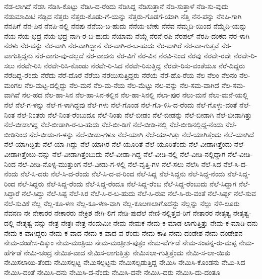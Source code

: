 ನೆಡ-ಲಾಗಿದೆ
ನೆಡಸಿ
ನೆಡಿಸಿ-ಕೊಟ್ಟು
ನೆಡಿಸಿ-ದ-ರೆಂದು
ನೆಡಿಸಿದ್ದ
ನೆಡಿಸುತ್ತಾನೆ
ನೆಡಿ-ಸುತ್ತಾಳೆ
ನೆಡಿ-ಸು-ವುದು
ನೆಡುಮಾಮಿಟಿ
ನೆಡ್ಸಿದ
ನೆತ್ತರು
ನೆತ್ತರು-ಕೊಡು-ಗೆ-ಯನ್ನು
ನೆತ್ತರು-ಗೊಡಗೆ-ಯಾಗಿ
ನೆತ್ತಿ
ನೆನ-ಪನ್ನು
ನೆನಪಿ-ಗಾಗಿ
ನೆನಪಿಗೆ
ನೆನ-ಪಿನ
ನೆನಪಿ-ನಲ್ಲಿ
ನೆನಪು
ನೆನೆಯ-ಬ-ಹುದು
ನೆನೆಯ-ಬೇಕು
ನೆನೆವ
ನೆಮ್ಮದಿ-ಯಿಂದ
ನೆಮ್ಮೆದಿ-ಯನ್ನು
ನೆಯ
ನೆಯ-ಭದ್ರ
ನೆಯ-ಭದ್ರ-ನಾಗಿ-ರ-ಬ-ಹುದು
ನೆಯಾಮ
ನೆಯ್ಗೆ
ನೆರನೆ-ರಪಿ
ನೆರಪಲ್
ನೆರಪಿ-ದಂಕದ
ನೆರ-ಳಾಗಿ
ನೆರಳು
ನೆರ-ವನ್ನು
ನೆರ-ವಾಗಿ
ನೆರ-ವಾಗಿದ್ದಾನೆ
ನೆರ-ವಾಗಿ-ರ-ಬ-ಹುದು
ನೆರ-ವಾಗಿರೆ
ನೆರ-ವಾ-ಗುತ್ತವೆ
ನೆರ-ವಾಗುತ್ತಿದ್ದನು
ನೆರ-ವಾಗು-ವು-ದಲ್ಲದೆ
ನೆರ-ವಾದನು
ನೆರ-ವಿಗೆ
ನೆರ-ವಿನ
ನೆರವಿ-ನಿಂದ
ನೆರವು
ನೆರವೇ-ರದೇ
ನೆರವೇ-ರಿ-ಸಲು
ನೆರವೇ-ರಿಸಿ
ನೆರವೇ-ರಿಸಿ-ಕೊಂಡು
ನೆರವೇ-ರಿ-ಸಿದ
ನೆರವೇ-ರಿಸುತ್ತಿದ್ದ
ನೆರವೇ-ರಿಸು-ವಂತೆಯೂ
ನೆರೆ-ದಿದ್ದರು
ನೆರೆದಿದ್ದ-ರೆಂದು
ನೆರೆದು
ನೆರೆ-ದೊರೆ
ನೆರೆಯ
ನೆರೆಯಿಸುತ್ತಿದ್ದರು
ನೆರೆಯೆ
ನೆರೆ-ಹೊ-ರೆಯ
ನೆಲ
ನೆಲಂ
ನೆಲನಂ
ನೆಲ-ಮಂಗಲ
ನೆಲ-ಮಟ್ಟ-ದಲ್ಲಿದ್ದು
ನೆಲ-ಮನೆ
ನೆಲ-ಮ-ನೆಯ
ನೆಲ-ಮೆಟ್ಟು
ನೆಲ-ವನ್ನು
ನೆಲ-ಸಮ-ವಾಗಿದೆ
ನೆಲ-ಸಮ-ವಾಗಿವೆ
ನೆಲ-ಹದ
ನೆಲ-ಹಾ-ಸಿನ
ನೆಲ-ಹಾ-ಸಿನ-ಕಲ್ಲಿನ
ನೆಲ-ಹಾ-ಸಿನಲ್ಲಿ
ನೆಲಾ-ಪುರ
ನೆಲು-ಮನೆ
ನೆಲು-ಮನೆ-ಯಲ್ಲಿ
ನೆಲೆ
ನೆಲೆ-ಗ-ಳನ್ನು
ನೆಲೆ-ಗ-ಳಾಗಿದ್ದವು
ನೆಲೆ-ಗಳು
ನೆಲೆ-ಗೊಂಡ
ನೆಲೆ-ಗೊ-ಳಿಸಿ-ದ-ರೆಂದು
ನೆಲೆ-ಗೊಳ್ಳು-ವಂತೆ
ನೆಲೆ-ನಿಂತ
ನೆಲೆ-ನಿಂತರು
ನೆಲೆ-ನಿಂತ-ರೆಂಬುದೂ
ನೆಲೆ-ನಿಂತು
ನೆಲೆ-ಬೀಡಂ
ನೆಲೆ-ಬೀಡನ್ನು
ನೆಲೆ-ಬೀಡಾಗಿ
ನೆಲೆ-ಬೀಡಾಗಿತ್ತು
ನೆಲೆ-ಬೀಡಾಗಿದ್ದ
ನೆಲೆ-ಬೀಡಾಗಿ-ರ-ಬ-ಹುದು
ನೆಲೆ-ಬೀ-ಡಿಗೆ
ನೆಲೆ-ಬೀಡಿ-ನಲ್ಲಿ
ನೆಲೆ-ಬೀಡಿನಲ್ಲಿದ್ದ-ನೆಂದು
ನೆಲೆ-ಬೀಡಿನಿಂದ
ನೆಲೆ-ಬೀಡು-ಗ-ಳನ್ನು
ನೆಲೆ-ಬೀಡು-ಗಳೂ
ನೆಲೆ-ಯಾಗಿ
ನೆಲೆ-ಯಾ-ಗಿತ್ತು
ನೆಲೆ-ಯಾಗಿತ್ತೆಂದು
ನೆಲೆ-ಯಾಗಿದೆ
ನೆಲೆ-ಯಾಗಿದ್ದಿತು
ನೆಲೆ-ಯಾ-ಗಿದ್ದು
ನೆಲೆ-ಯಾಗಿರ
ನೆಲೆ-ಯೂರಿತೆ
ನೆಲೆ-ಯೂರಿತೆಂದು
ನೆಲೆ-ವೀಡಾಗಿತ್ತೆಂದು
ನೆಲೆ-ವೀಡಾಗಿತ್ತೆಂಬು-ದನ್ನು
ನೆಲೆ-ವೀಡಾಗಿತ್ತೆಂಬುದು
ನೆಲೆ-ವೀಡಾ-ಗಿದ್ದ
ನೆಲೆ-ವೀಡಿ-ನಲ್ಲಿ
ನೆಲೆ-ವೀಡಿ-ನಲ್ಲಿದ್ದಾಗ
ನೆಲೆ-ವೀಡಿ-ನಿಂದ
ನೆಲೆ-ವೀಡಿ-ನೊಳ್ಸ-ಮುತ್ತುಂಗ
ನೆಲೆ-ವೀಡು-ಗ-ಳಲ್ಲಿ
ನೆಲೆ-ವೃತ್ತಿ-ಗಳ
ನೆಲೆ-ಸಲು
ನೆಲೆಸಿ
ನೆಲೆ-ಸಿದ
ನೆಲೆ-ಸಿ-ದ-ನೆಂದು
ನೆಲೆ-ಸಿ-ದರು
ನೆಲೆ-ಸಿ-ದ-ರೆಂದು
ನೆಲೆ-ಸಿ-ದ-ವ-ರಿಂದ
ನೆಲೆ-ಸಿದ್ದ
ನೆಲೆ-ಸಿದ್ದನು
ನೆಲೆ-ಸಿದ್ದ-ನೆಂದು
ನೆಲೆ-ಸಿದ್ದ-ರಿಂದ
ನೆಲೆ-ಸಿದ್ದರು
ನೆಲೆ-ಸಿದ್ದ-ರೆಂದು
ನೆಲೆ-ಸಿದ್ದ-ರೆಂದೂ
ನೆಲೆ-ಸಿದ್ದ-ರೆಂಬ
ನೆಲೆ-ಸಿದ್ದ-ರೆಂಬುದು
ನೆಲೆ-ಸಿದ್ದಾಗ
ನೆಲೆ-ಸಿದ್ದಾರೆ
ನೆಲೆ-ಸಿದ್ದು
ನೆಲೆ-ಸಿಪ್ಪ
ನೆಲೆ-ಸಿರ
ನೆಲೆ-ಸಿ-ರ-ಬ-ಹುದು
ನೆಲೆ-ಸಿ-ರುವ
ನೆಲೆ-ಸಿ-ರು-ವಂತೆ
ನೆಲೆ-ಸಿರ್ಪ್ಪ
ನೆಲೆ-ಸುವ
ನೆಲೆ-ಸುವಿಕೆ
ನೆಲ್ಲ
ನೆಲ್ಲ-ಕೂ-ಳಣ
ನೆಲ್ಲ-ಕೂ-ಳಣ-ವಾಗಿ
ನೆಲ್ಲ-ಕೂೞಣಲಾಗೊದೆನ್ದು
ನೆಲ್ಲನ್ನು
ನೆಲ್ಲು
ನೆಳಿ-ಲೂರು
ನೆವನಣ
ನೇ
ನೇಕಾರರ
ನೇಕಾರರು
ನೇಕ್ರಿಶ
ನೇಗಿ-ಲಿಗೆ
ನೇಡಿ-ಪುದೆಲೆ
ನೇಣಿ-ನಲ್ಲಿತ್ತವ-ರಿಗೆ
ನೇತಾರರ
ನೇತೃತ್ವ
ನೇತೃತ್ವ-ದಲ್ಲಿ
ನೇತೃತ್ವ-ವನ್ನು
ನೇತ್ರ
ನೇತ್ರಃ
ನೇತ್ರ-ನೆಂದುಮೀ
ನೇಮ
ನೇಮಕ
ನೇಮ-ಕ-ಮಾಡ-ಲಾಗುತ್ತಿತ್ತು
ನೇಮ-ಕ-ಮಾಡಿ-ದನು
ನೇಮ-ಕ-ವಾಗಿದ್ದರು
ನೇಮ-ಕ-ವಾದ
ನೇಮ-ಕ-ವಾದ-ವ-ರೆಂದು
ನೇಮ-ಕಾತಿ
ನೇಮ-ದಂಡೇಶ
ನೇಮ-ದಂಡೇಶನ
ನೇಮ-ದಂಡೇಸ-ದಿಕ್ಕುಂ
ನೇಮ-ಮಂತ್ರಿಯ
ನೇಮ-ಮಂತ್ರೀಶ-ಪುತ್ರಂ
ನೇಮ-ವೆರ್ಗಡೆ
ನೇಮ-ಸಂಪನ್ನ-ರು-ಮಪ್ಪ
ನೇಮ-ಹೆರ್ಗಡೆ
ನೇಮಿ-ಚಂದ್ರ
ನೇಮಿತ-ವಾದ
ನೇಮಿಸ-ಲಾಗುತ್ತಿತ್ತು
ನೇಮಿಸಲಾ-ಗುತ್ತಿತ್ತೆಂದು
ನೇಮಿ-ಸ-ಲಾ-ಯಿತು
ನೇಮಿಸಲಾಯಿ-ತೆಂದು
ನೇಮಿಸಲ್ಪಟ್ಟ
ನೇಮಿಸಲ್ಪಟ್ಟನು
ನೇಮಿಸಲ್ಪಡುತ್ತಿದ್ದ
ನೇಮಿಸಿ
ನೇಮಿಸಿ-ಕೊಂಡನು
ನೇಮಿ-ಸಿದ
ನೇಮಿಸಿ-ದಂತೆ
ನೇಮಿಸಿ-ದನು
ನೇಮಿಸಿ-ದ-ನೆಂದು
ನೇಮಿಸಿ-ದನೇ
ನೇಮಿಸಿ-ದರು
ನೇಮಿಸಿ-ದು-ದಂತೂ
